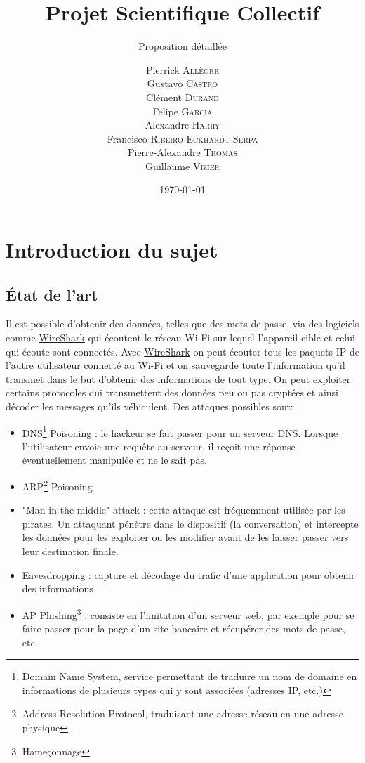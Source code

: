 \documentclass[a4paper, 12pt,twoside]{article}
\title{Projet Scientifique Collectif}
\author{Pierrick \textsc{Allègre} \\
		Gustavo \textsc{Castro} \\
		Clément \textsc{Durand} \\
		Felipe \textsc{Garcia} \\
		Alexandre \textsc{Harry} \\
		Francisco \textsc{Ribeiro Eckhardt Serpa} \\
		Pierre-Alexandre \textsc{Thomas} \\
		Guillaume \textsc{Vizier} \\}
\subtitle{Proposition détaillée}
\date{\today}
\begin{document}
\maketitle
\renewcommand{\baselinestretch}{1.1}
\setlength{\parskip}{0.5em}
\tableofcontents\clearpage

\newcommand{\vrac}[1]{\ifthenelse{\boolean{fac}}{{\color{red}\itshape #1}}{}}

\section{Introduction du sujet}

	
	\subsection{État de l'art}
	
	Il est possible d'obtenir des données, telles que des mots de passe, via des logiciels comme \newcommand{\wireshark}{\href{https://www.wireshark.org}{WireShark}} \wireshark{} qui écoutent le réseau \newcommand{\wifi}{Wi-Fi} \wifi{} sur lequel l'appareil cible et celui qui écoute sont connectés. Avec \wireshark{} on peut écouter tous les paquets IP de l'autre utilisateur connecté au \wifi{} et on sauvegarde toute l'information qu'il transmet dans le but d'obtenir des informations de tout type. On peut exploiter certains protocoles qui transmettent des données  peu ou pas cryptées et ainsi décoder les messages qu'ils véhiculent. Des attaques possibles sont: 
	
	\begin{itemize}\setlength{\parskip}{0pt}
		\item DNS\footnote{Domain Name System, service permettant de traduire un nom de domaine en informations de plusieurs types qui y sont associées (adresses IP, etc.)} Poisoning : le hackeur se fait passer pour un serveur DNS. Lorsque l'utilisateur envoie une requête au serveur, il reçoit une réponse éventuellement manipulée et ne le sait pas. 
		\item ARP\footnote{Address Resolution Protocol, traduisant une adresse réseau en une adresse physique} Poisoning
		\item "Man in the middle" attack : cette attaque est fréquemment utilisée par les pirates. Un attaquant pénètre dans le dispositif (la conversation) et intercepte les données pour les exploiter ou les modifier avant de les laisser passer vers leur destination finale.
		\item Eavesdropping : capture et décodage du trafic d'une application pour obtenir des informations
		\item AP Phishing\footnote{Hameçonnage} : consiste en l'imitation d'un serveur web, par exemple pour se faire passer pour la page d'un site bancaire et récupérer des mots de passe, etc.
	\end{itemize}
\end{document}
